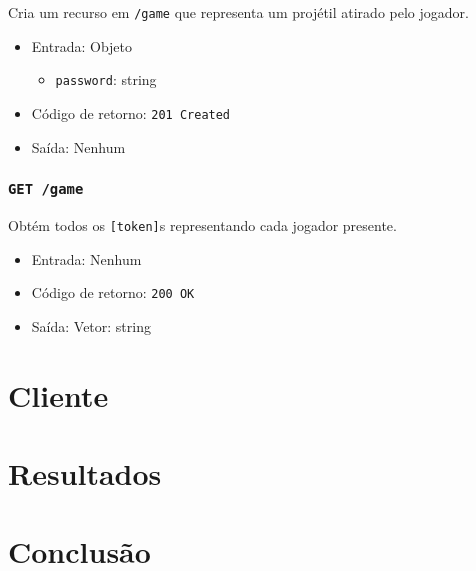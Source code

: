 \documentclass[12pt,a4paper]{article}
\begin{document}
Cria um recurso em \texttt{/game} que representa um projétil atirado pelo
jogador.

\begin{itemize}
	\item Entrada: Objeto
		\begin{itemize}
			\item \texttt{password}: string
		\end{itemize}
	\item Código de retorno: \texttt{201 Created}
	\item Saída: Nenhum
\end{itemize}

\subsubsection{\texttt{GET /game}}

Obtém todos os \texttt{[token]}s representando cada jogador presente.

\begin{itemize}
	\item Entrada: Nenhum
	\item Código de retorno: \texttt{200 OK}
	\item Saída: Vetor: string
\end{itemize}

\pagebreak \section{Cliente}

\pagebreak \section{Resultados}

\pagebreak \section{Conclusão}

%
%
\end{document}
